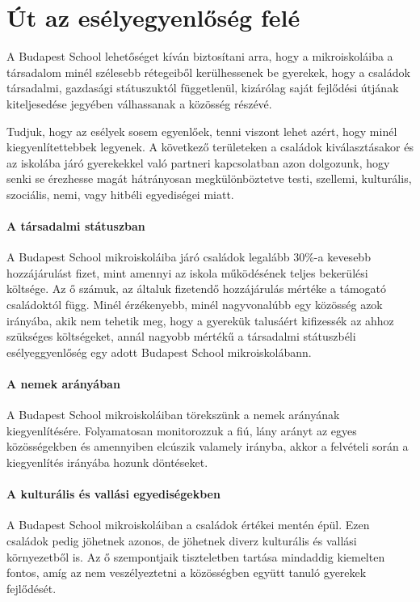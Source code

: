 \section{Út az esélyegyenlőség felé}

A Budapest School lehetőséget kíván biztosítani arra, hogy a
mikroiskoláiba a társadalom minél szélesebb rétegeiből kerülhessenek be
gyerekek, hogy a családok társadalmi, gazdasági státuszuktól
függetlenül, kizárólag saját fejlődési útjának kiteljesedése jegyében
válhassanak a közösség részévé.

Tudjuk, hogy az esélyek sosem egyenlőek, tenni viszont lehet azért, hogy
minél kiegyenlítettebbek legyenek. A következő területeken a családok
kiválasztásakor és az iskolába járó gyerekekkel való partneri
kapcsolatban azon dolgozunk, hogy senki se érezhesse magát hátrányosan
megkülönböztetve testi, szellemi, kulturális, szociális, nemi, vagy
hitbéli egyediségei miatt.

\paragraph{A társadalmi státuszban}

  A Budapest School mikroiskoláiba járó családok legalább 30\%-a
  kevesebb hozzájárulást fizet, mint amennyi az iskola működésének
  teljes bekerülési költsége. Az ő számuk, az általuk fizetendő
  hozzájárulás mértéke a támogató családoktól függ. Minél érzékenyebb,
  minél nagyvonalúbb egy közösség azok irányába, akik nem tehetik meg,
  hogy a gyerekük talusáért kifizessék az ahhoz szükséges költségeket,
  annál nagyobb mértékű a társadalmi státuszbéli esélyeggyenlőség egy
  adott Budapest School mikroiskolábann.


\paragraph{A nemek arányában}


  A Budapest School mikroiskoláiban törekszünk a nemek arányának
  kiegyenlítésére. Folyamatosan monitorozzuk a fiú, lány arányt az egyes
  közösségekben és amennyiben elcúszik valamely irányba, akkor a
  felvételi során a kiegyenlítés irányába hozunk döntéseket.


\paragraph{A kulturális és vallási egyediségekben}


  A Budapest School mikroiskoláiban a családok értékei mentén épül. Ezen
  családok pedig jöhetnek azonos, de jöhetnek diverz kulturális és
  vallási környezetből is. Az ő szempontjaik tiszteletben tartása
  mindaddig kiemelten fontos, amíg az nem veszélyeztetni a közösségben
  együtt tanuló gyerekek fejlődését.


